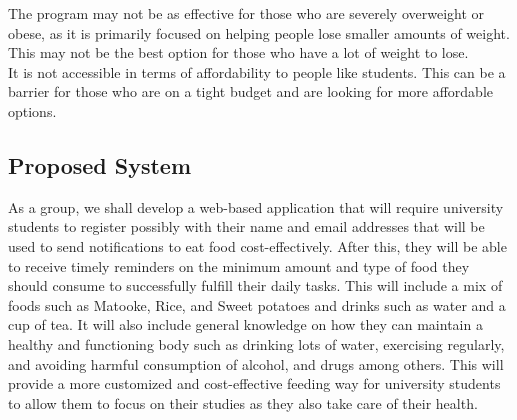 \documentclass {article}
\begin{document}
\noindent The program may not be as effective for those who are severely overweight or obese, as it is primarily focused on helping people lose smaller amounts of weight. This may not be the best option for those who have a lot of weight to lose.\\

\noindent It is not accessible in terms of affordability to people like students. This can be a barrier for those who are on a tight budget and are looking for more affordable options.\\

\subsection{Proposed System}
\noindent As a group, we shall develop a web-based application that will require university students to register possibly with their name and email addresses that will be used to send notifications to eat food cost-effectively. After this, they will be able to receive timely reminders on the minimum amount and type of food they should consume to successfully fulfill their daily tasks. This will include a mix of foods such as Matooke, Rice, and Sweet potatoes and drinks such as water and a cup of tea. It will also include general knowledge on how they can maintain a healthy and functioning body such as drinking lots of water, exercising regularly, and avoiding harmful consumption of alcohol, and drugs among others.
This will provide a more customized and cost-effective feeding way for university students to allow them to focus on their studies as they also take care of their health.
\end{document}
